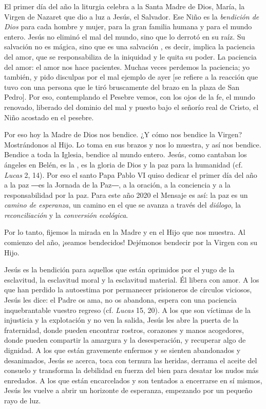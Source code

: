 El primer día del año la liturgia celebra a la Santa Madre de Dios, María, la Virgen de Nazaret que dio a luz a Jesús, el Salvador. Ese Niño es la \emph{bendición de Dios} para cada hombre y mujer, para la gran familia humana y para el mundo entero. Jesús no eliminó el mal del mundo, sino que lo derrotó en su raíz. Su salvación no es mágica, sino que es una salvación , es decir, implica la paciencia del amor, que se responsabiliza de la iniquidad y le quita su poder. La paciencia del amor: el amor nos hace pacientes. Muchas veces perdemos la paciencia; yo también, y pido disculpas por el mal ejemplo de ayer {[}se refiere a la reacción que tuvo con una persona que le tiró bruscamente del brazo en la plaza de San Pedro{]}. Por eso, contemplando el Pesebre vemos, con los ojos de la fe, el mundo renovado, liberado del dominio del mal y puesto bajo el señorío real de Cristo, el Niño acostado en el pesebre.

Por eso hoy la Madre de Dios nos bendice. ¿Y cómo nos bendice la Virgen? Mostrándonos al Hijo. Lo toma en sus brazos y nos lo muestra, y así nos bendice. Bendice a toda la Iglesia, bendice al mundo entero. Jesús, como cantaban los ángeles en Belén, es la , es la gloria de Dios y la paz para la humanidad (cf. \emph{Lucas} 2, 14). Por eso el santo Papa Pablo VI quiso dedicar el primer día del año a la paz ―es la Jornada de la Paz―, a la oración, a la conciencia y a la responsabilidad por la paz. Para este año 2020 el Mensaje es así: la paz es un \emph{camino de esperanza}, un camino en el que se avanza a través del \emph{diálogo}, la \emph{reconciliación} y la \emph{conversión ecológica}.

Por lo tanto, fijemos la mirada en la Madre y en el Hijo que nos muestra. Al comienzo del año, ¡seamos bendecidos! Dejémonos bendecir por la Virgen con su Hijo.

Jesús es la bendición para aquellos que están oprimidos por el yugo de la esclavitud, la esclavitud moral y la esclavitud material. Él libera con amor. A los que han perdido la autoestima por permanecer prisioneros de círculos viciosos, Jesús les dice: el Padre os ama, no os abandona, espera con una paciencia inquebrantable vuestro regreso (cf. \emph{Lucas} 15, 20). A los que son víctimas de la injusticia y la explotación y no ven la salida, Jesús les abre la puerta de la fraternidad, donde pueden encontrar rostros, corazones y manos acogedores, donde pueden compartir la amargura y la desesperación, y recuperar algo de dignidad. A los que están gravemente enfermos y se sienten abandonados y desanimados, Jesús se acerca, toca con ternura las heridas, derrama el aceite del consuelo y transforma la debilidad en fuerza del bien para desatar los nudos más enredados. A los que están encarcelados y son tentados a encerrarse en sí mismos, Jesús les vuelve a abrir un horizonte de esperanza, empezando por un pequeño rayo de luz.

